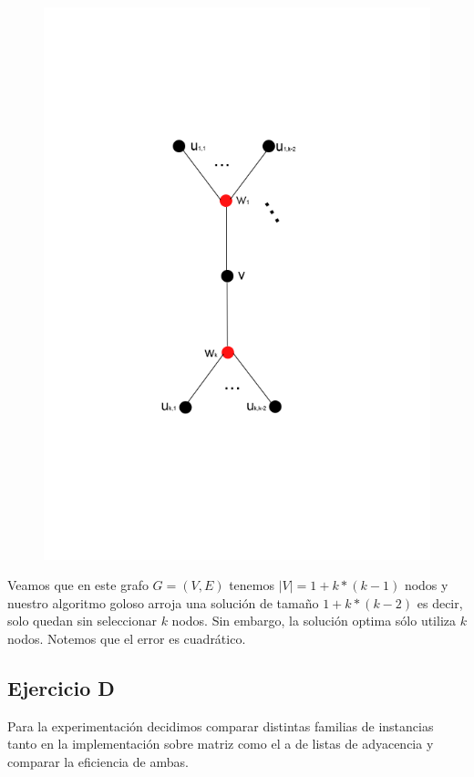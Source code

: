 \begin{figure}[h]
\begin{center}
\includegraphics[scale=0.5]{imagenes/grafos-ej3-tp3-3.png}
\end{center}
\end{figure}

Veamos que en este grafo $G=(V,E)$ tenemos $|V| = 1 + k*(k-1)$ nodos y nuestro algoritmo goloso arroja una solución de tamaño $1 + k*(k-2)$ es decir, solo quedan sin seleccionar $k$ nodos. Sin embargo, la solución optima sólo utiliza $k$ nodos. Notemos que el error es cuadrático.

\subsection{Ejercicio D}

Para la experimentación decidimos comparar distintas familias de instancias tanto en la implementación sobre matriz como el a de listas de adyacencia y comparar la eficiencia de ambas.

